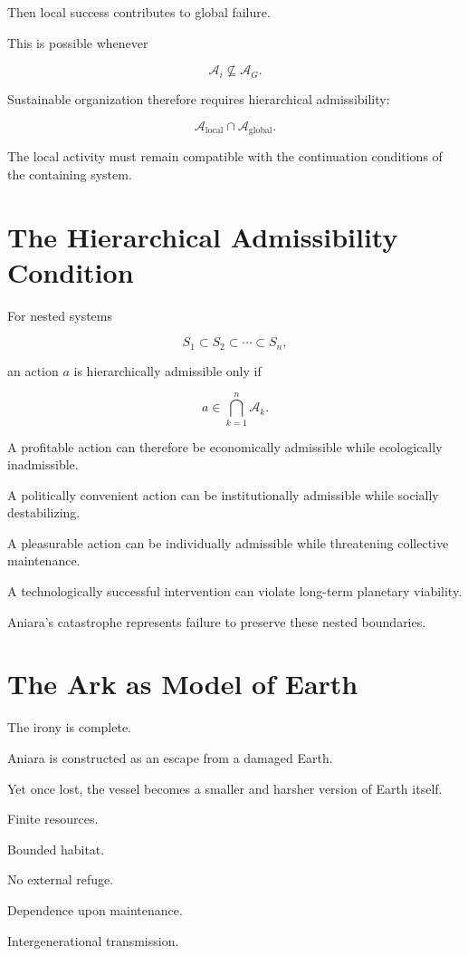 \documentclass[11pt,oneside]{book}
\theoremstyle{definition}
\theoremstyle{remark}
\newcommand{\A}{\mathcal{A}}
\begin{document}
Then local success contributes to global failure.

This is possible whenever

\[
\A_i
\not\subseteq
\A_G.
\]

Sustainable organization therefore requires hierarchical admissibility:

\[
\A_{\mathrm{local}}
\cap
\A_{\mathrm{global}}.
\]

The local activity must remain compatible with the continuation conditions of the containing system.

\section{The Hierarchical Admissibility Condition}

For nested systems

\[
S_1\subset S_2\subset\cdots\subset S_n,
\]

an action \(a\) is hierarchically admissible only if

\[
a\in
\bigcap_{k=1}^{n}
\A_k.
\]

A profitable action can therefore be economically admissible while ecologically inadmissible.

A politically convenient action can be institutionally admissible while socially destabilizing.

A pleasurable action can be individually admissible while threatening collective maintenance.

A technologically successful intervention can violate long-term planetary viability.

Aniara's catastrophe represents failure to preserve these nested boundaries.

\section{The Ark as Model of Earth}

The irony is complete.

Aniara is constructed as an escape from a damaged Earth.

Yet once lost, the vessel becomes a smaller and harsher version of Earth itself.

Finite resources.

Bounded habitat.

No external refuge.

Dependence upon maintenance.

Intergenerational transmission.
\end{document}
